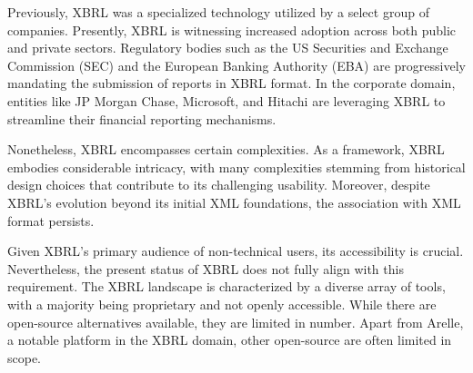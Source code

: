 Previously, XBRL was a specialized technology utilized by a select group of companies.
Presently, XBRL is witnessing increased adoption across both public and private sectors.
Regulatory bodies such as the US Securities and Exchange Commission (SEC) and the European Banking Authority (EBA)\cite{eba_reporting_frameworks} are progressively mandating the submission of reports in XBRL format.\cite{sec_ixbrl}
In the corporate domain, entities like JP Morgan Chase, Microsoft, and Hitachi are leveraging XBRL to streamline their financial reporting mechanisms.\cite{pwc2002thejournal}

Nonetheless, XBRL encompasses certain complexities.
As a framework, XBRL embodies considerable intricacy,
with many complexities stemming from historical design choices that contribute to its challenging usability.
Moreover, despite XBRL's evolution beyond its initial XML foundations,
the association with XML format persists.

Given XBRL's primary audience of non-technical users, its accessibility is crucial.
Nevertheless,
the present status of XBRL does not fully align with this requirement.
The XBRL landscape is characterized by a diverse array of tools,
with a majority being proprietary and not openly accessible.
While there are open-source alternatives available,
they are limited in number.
Apart from Arelle, a notable platform in the XBRL domain\cite{arelle},
other open-source are often limited in scope.

